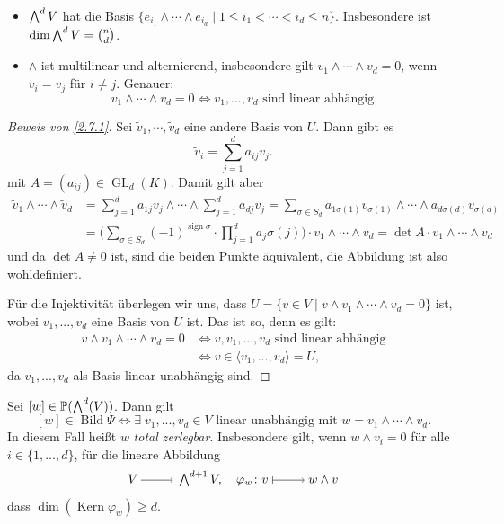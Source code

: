 \documentclass[a4paper,12pt]{scrbook}
\theoremstyle{keinenummern} %
\theoremstyle{mitnummern}
\theoremstyle{unserbeweis}
\newtheorem{proof}{Beweis}
\def\P{\mathbb{P}}
\newcommand{\Kern}{\operatorname{Kern}}
\newcommand{\Bild}{\operatorname{Bild}}
\newcommand{\GL}{\operatorname{GL}}
\newcommand{\sign}{\operatorname{sign}}
\renewcommand{\dotsc}{\ensuremath{\!...}}
\let\grassmann\bigwedge
\def\bigwedge{\begingroup\textstyle\grassmann\endgroup}
\newcommand{\ra}{\raisebox{-1pt}{\tikz{\draw[thin,shorten >=3pt, ->] (0,0) node{\hspace*{-2pt}} -- node{} (1,0);}}\penalty1000\relax}
\renewcommand{\mapsto}{\raisebox{-1pt}{\tikz{\draw[thin,shorten >=3pt, |->] (0,0) node{\hspace*{0pt}} -- node{} (1,0);}}\penalty1000\relax}
\begin{document}
\begin{nerinnerung}\begin{itemize}[leftmargin=*,labelindent=\parindent]
\item $\bigwedge^{d}V$ hat die Basis $\{e_{i_{1}}\wedge\dotsm\wedge e_{i_{d}}\mid 1\leq i_{1}<\dotsm<i_{d}\leq n\}$.
Insbesondere ist $\dim\bigwedge^{d}V=\binom{n}{d}$.
%
\item $\wedge$ ist multilinear und alternierend, insbesondere gilt $v_{1}\wedge\dotsm\wedge v_{d}=0$, wenn $v_{i}=v_{j}$ für $i\neq j$. Genauer:
\[v_{1}\wedge\dotsm\wedge v_{d}=0\iff v_{1},\dotsc, v_{d}\text{ sind linear abhängig.}\]
\end{itemize}\end{nerinnerung}

\begin{proof}[Beweis von \cref{2.7.1}]
Sei $\tilde{v}_{1},\dotsm,\tilde{v}_{d}$ eine andere Basis von $U$. Dann gibt es
\[\tilde{v}_{i}=\sum_{j=1}^{d}a_{ij}v_{j}.\]
mit $A=(a_{ij})\in\GL_{d}(K)$. Damit gilt aber
\begin{align*}
\tilde{v}_{1}\wedge\dotsm\wedge\tilde{v}_{d}&=\sum_{j=1}^{d}a_{1j}v_{j}\wedge\dotsm\wedge\sum_{j=1}^{d}a_{dj}v_{j}=\sum_{\sigma\in S_{d}}a_{1\sigma(1)}v_{\sigma(1)}\wedge\dotsm\wedge a_{d\sigma(d)}v_{\sigma(d)}\\
&=\biggl(\sum_{\sigma\in S_{d}}(-1)^{\sign\sigma}\cdot\prod_{j=1}^{d}a_{j}\sigma(j)\biggr)\cdot v_{1}\wedge\dotsm\wedge v_{d}=\det A\cdot v_{1}\wedge\dotsm\wedge v_{d}
\end{align*}
und da $\det A\neq 0$ ist, sind die beiden Punkte äquivalent, die Abbildung ist also wohldefiniert.

Für die Injektivität überlegen wir uns, dass $U=\{v\in V\mid v\wedge v_{1}\wedge\dotsm\wedge v_{d}=0\}$ ist, wobei $v_{1},\dotsc, v_{d}$ eine Basis von $U$ ist. Das ist so, denn es gilt:
\begin{align*}
v\wedge v_{1}\wedge\dotsm\wedge v_{d}=0&\iff v,v_{1},\dotsc,v_{d}\text{ sind linear abhängig}\\
&\iff v\in\langle v_{1},\dotsc,v_{d}\rangle=U,
\end{align*}
da $v_{1},\dotsc,v_{d}$ als Basis linear unabhängig sind.
\end{proof}

\begin{db}\label{2.7.2}
Sei $[w]\in\P(\bigwedge^{d}(V))$. Dann gilt
\[[w]\in\Bild\Psi\iff\exists\; v_{1},\dotsc,v_{d}\in V\text{ linear unabhängig mit }w=v_{1}\wedge\dotsm\wedge v_{d}.\]
In diesem Fall heißt $w$ \emph{total zerlegbar}. Insbesondere gilt, wenn $w\wedge v_{i}=0$ für alle $i\in\{1,\dotsc,d\}$, für die lineare Abbildung
\[V\ra\bigwedge^{d+1}V,\quad \varphi_{w}\colon v\mapsto w\wedge v\]
dass $\dim(\Kern\varphi_{w})\geq d$.
\end{db}
\end{document}
